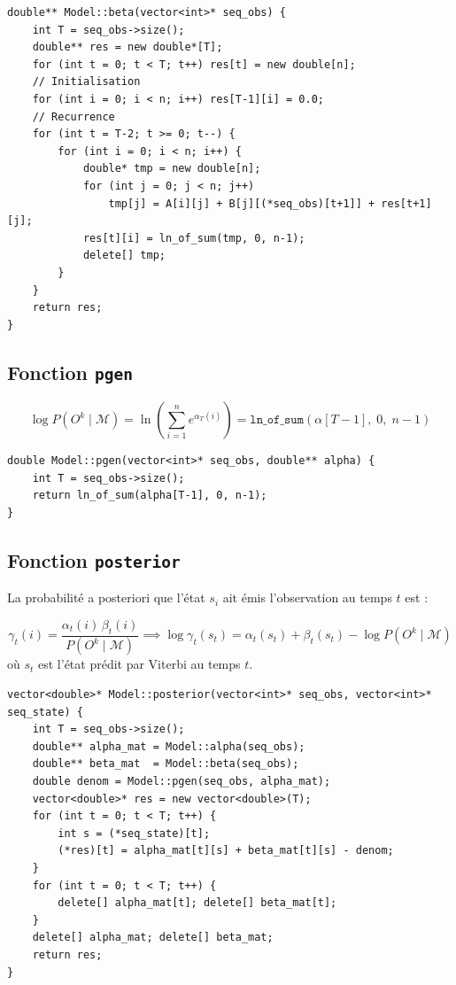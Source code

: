 \documentclass[12pt,a4paper]{article}
\begin{document}
\begin{lstlisting}[style=cppstyle, caption={\texttt{beta} --- \texttt{model.cpp}}]
double** Model::beta(vector<int>* seq_obs) {
    int T = seq_obs->size();
    double** res = new double*[T];
    for (int t = 0; t < T; t++) res[t] = new double[n];
    // Initialisation
    for (int i = 0; i < n; i++) res[T-1][i] = 0.0;
    // Recurrence
    for (int t = T-2; t >= 0; t--) {
        for (int i = 0; i < n; i++) {
            double* tmp = new double[n];
            for (int j = 0; j < n; j++)
                tmp[j] = A[i][j] + B[j][(*seq_obs)[t+1]] + res[t+1][j];
            res[t][i] = ln_of_sum(tmp, 0, n-1);
            delete[] tmp;
        }
    }
    return res;
}
\end{lstlisting}

\subsection{Fonction \texttt{pgen}}

\begin{formulebox}
\[
  \log P(O^k \mid \mathcal{M}) = \ln\!\left(\sum_{i=1}^{n} e^{\alpha_T(i)}\right)
  = \texttt{ln\_of\_sum}(\alpha[T-1],\; 0,\; n-1)
\]
\end{formulebox}

\begin{lstlisting}[style=cppstyle, caption={\texttt{pgen} --- \texttt{model.cpp}}]
double Model::pgen(vector<int>* seq_obs, double** alpha) {
    int T = seq_obs->size();
    return ln_of_sum(alpha[T-1], 0, n-1);
}
\end{lstlisting}

\subsection{Fonction \texttt{posterior}}

La probabilité a posteriori que l'état $s_i$ ait émis l'observation au temps $t$ est :

\begin{formulebox}
\[
  \gamma_t(i) = \frac{\alpha_t(i)\,\beta_t(i)}{P(O^k \mid \mathcal{M})}
  \implies
  \log \gamma_t(s_t) = \alpha_t(s_t) + \beta_t(s_t) - \log P(O^k \mid \mathcal{M})
\]
où $s_t$ est l'état prédit par Viterbi au temps $t$.
\end{formulebox}

\begin{lstlisting}[style=cppstyle, caption={\texttt{posterior} --- \texttt{model.cpp}}]
vector<double>* Model::posterior(vector<int>* seq_obs, vector<int>* seq_state) {
    int T = seq_obs->size();
    double** alpha_mat = Model::alpha(seq_obs);
    double** beta_mat  = Model::beta(seq_obs);
    double denom = Model::pgen(seq_obs, alpha_mat);
    vector<double>* res = new vector<double>(T);
    for (int t = 0; t < T; t++) {
        int s = (*seq_state)[t];
        (*res)[t] = alpha_mat[t][s] + beta_mat[t][s] - denom;
    }
    for (int t = 0; t < T; t++) {
        delete[] alpha_mat[t]; delete[] beta_mat[t];
    }
    delete[] alpha_mat; delete[] beta_mat;
    return res;
}
\end{lstlisting}
\end{document}
